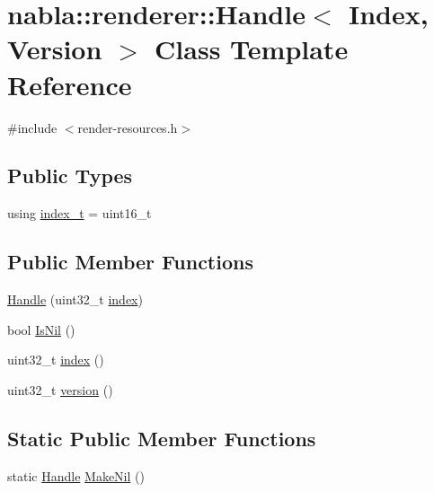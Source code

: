 \hypertarget{classnabla_1_1renderer_1_1_handle}{}\section{nabla\+::renderer\+::Handle$<$ Index, Version $>$ Class Template Reference}
\label{classnabla_1_1renderer_1_1_handle}


{\ttfamily \#include $<$render-\/resources.\+h$>$}

\subsection*{Public Types}
\begin{DoxyCompactItemize}
\item 
using \mbox{\hyperlink{classnabla_1_1renderer_1_1_handle_a84dca34f5b735ae64ed8ca821e376c59}{index\+\_\+t}} = uint16\+\_\+t
\end{DoxyCompactItemize}
\subsection*{Public Member Functions}
\begin{DoxyCompactItemize}
\item 
\mbox{\hyperlink{classnabla_1_1renderer_1_1_handle_a1620bf65767fb875c18ba069d57bef81}{Handle}} (uint32\+\_\+t \mbox{\hyperlink{classnabla_1_1renderer_1_1_handle_a6a7cfb244abcfbcead2e3d4d47f52167}{index}})
\item 
bool \mbox{\hyperlink{classnabla_1_1renderer_1_1_handle_a5b9546ca538d96a0e1172fbe1c965793}{Is\+Nil}} ()
\item 
uint32\+\_\+t \mbox{\hyperlink{classnabla_1_1renderer_1_1_handle_a6a7cfb244abcfbcead2e3d4d47f52167}{index}} ()
\item 
uint32\+\_\+t \mbox{\hyperlink{classnabla_1_1renderer_1_1_handle_a5168abd8dec2822bb1720b2e65e884b2}{version}} ()
\end{DoxyCompactItemize}
\subsection*{Static Public Member Functions}
\begin{DoxyCompactItemize}
\item 
static \mbox{\hyperlink{classnabla_1_1renderer_1_1_handle}{Handle}} \mbox{\hyperlink{classnabla_1_1renderer_1_1_handle_a431d40c431625c3001b95485bcfafc97}{Make\+Nil}} ()
\end{DoxyCompactItemize}


